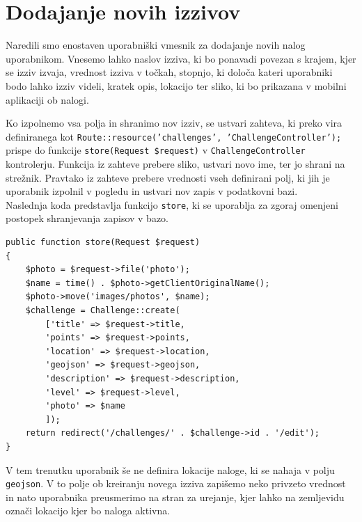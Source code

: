 \documentclass[a4paper, 12pt]{book}
\begin{document}
\section{Dodajanje novih izzivov}
Naredili smo enostaven uporabniški vmesnik za dodajanje novih nalog uporabnikom. Vnesemo lahko naslov izziva, ki bo ponavadi povezan s krajem, kjer se izziv izvaja, vrednost izziva v točkah, stopnjo, ki določa kateri uporabniki bodo lahko izziv videli, kratek opis, lokacijo ter sliko, ki bo prikazana v mobilni aplikaciji ob nalogi.

Ko izpolnemo vsa polja in shranimo nov izziv, se ustvari zahteva, ki preko vira definiranega kot \texttt{Route::resource('challenges', 'ChallengeController');} prispe do funkcije \texttt{store(Request \$request)} v \texttt{ChallengeController} kontrolerju. Funkcija iz zahteve prebere sliko, ustvari novo ime, ter jo shrani na strežnik. Pravtako iz zahteve prebere vrednosti vseh definirani polj, ki jih je uporabnik izpolnil v pogledu in ustvari nov zapis v podatkovni bazi.\\Naslednja koda predstavlja funkcijo \texttt{store}, ki se uporablja za zgoraj omenjeni postopek shranjevanja zapisov v bazo. 

\begin{lstlisting}
public function store(Request $request)
{
    $photo = $request->file('photo');
    $name = time() . $photo->getClientOriginalName();
    $photo->move('images/photos', $name);
    $challenge = Challenge::create(
        ['title' => $request->title,
        'points' => $request->points,
        'location' => $request->location,
        'geojson' => $request->geojson,
        'description' => $request->description,
        'level' => $request->level,
        'photo' => $name
        ]);   
    return redirect('/challenges/' . $challenge->id . '/edit');
}
\end{lstlisting}

\noindent V tem trenutku uporabnik še ne definira lokacije naloge, ki se nahaja v polju \texttt{geojson}. V to polje ob kreiranju novega izziva zapišemo neko privzeto vrednost in nato uporabnika preusmerimo na stran za urejanje, kjer lahko na zemljevidu označi lokacijo kjer bo naloga aktivna.
\end{document}
